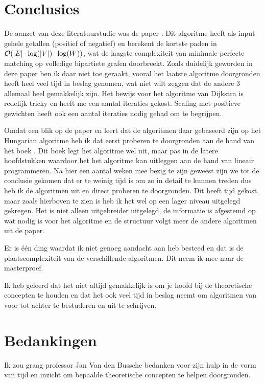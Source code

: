 \documentclass[conference]{IEEEtran}
\theoremstyle{definition}
\theoremstyle{remark}
\DeclarePairedDelimiter{\card}{\vert}{\vert}  %
\begin{document}
\section*{Conclusies}
De aanzet van deze literatuurstudie was de paper  \cite{bernstein2023negativeweight}. Dit algoritme heeft als input gehele getallen (positief of negatief) en berekent de kortste paden in $\mathcal{O}(\card{E} \cdot \log(\card{V}) \cdot \log(W))$, wat de laagste complexiteit van minimale perfecte matching op volledige bipartiete grafen doorbreekt. Zoals duidelijk geworden in deze paper ben ik daar niet toe geraakt, vooral het laatste algoritme doorgronden heeft heel veel tijd in beslag genomen, wat niet wilt zeggen dat de andere 3 allemaal heel gemakkelijk zijn. Het bewijs voor het algoritme van Dijkstra is redelijk tricky en heeft me een aantal iteraties gekost. Scaling met positieve gewichten heeft ook een aantal iteraties nodig gehad om te begrijpen.

Omdat een blik op de paper \cite{Scaling} en \cite{FasterScaling} leert dat de algoritmen daar gebaseerd zijn op het Hungarian algoritme heb ik dat eerst proberen te doorgronden aan de hand van het boek  \cite{combinatorialOptimization}. Dit boek legt het algoritme wel uit, maar pas in de latere hoofdstukken waardoor het het algoritme kan uitleggen aan de hand van lineair programmeren. Na hier een aantal weken mee bezig te zijn geweest zijn we tot de conclusie gekomen dat er te weinig tijd is om zo in detail te kunnen treden dus heb ik de algoritmen uit \cite{Scaling} en \cite{FasterScaling} direct proberen te doorgronden. Dit heeft tijd gekost, maar zoals hierboven te zien is heb ik het wel op een lager niveau uitgelegd gekregen. Het is niet alleen uitgebreider uitgelegd, de informatie is afgestemd op wat nodig is voor het algoritme en de structuur volgt meer de andere algoritmen uit de paper.

Er is één ding waardat ik niet genoeg aandacht aan heb besteed en dat is de plaatscomplexiteit van de verschillende algoritmen. Dit neem ik mee naar de masterproef.

Ik heb geleerd dat het niet altijd gemakkelijk is om je hoofd bij de theoretische concepten te houden en dat het ook veel tijd in beslag neemt om algoritmen van voor tot achter te bestuderen en uit te schrijven.


\section*{Bedankingen}
Ik zou graag professor Jan Van den Bussche bedanken voor zijn hulp in de vorm van tijd en inzicht om bepaalde theoretische concepten te helpen doorgronden.
\end{document}
